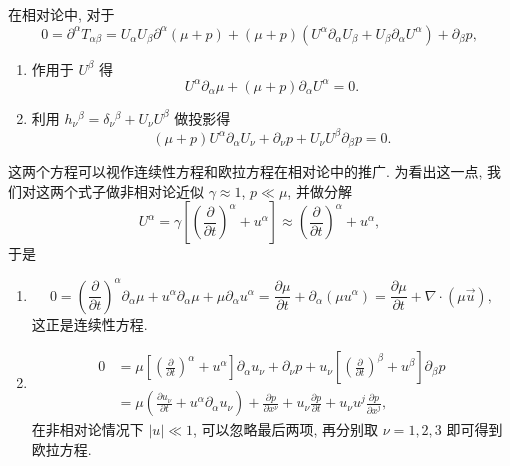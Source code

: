 在相对论中, 对于
\[ 0=\partial^\alpha T_{\alpha \beta}=U_\alpha U_\beta\partial^\alpha(\mu+p)+(\mu+p)(U^\alpha \partial_\alpha U_\beta+U_\beta\partial_\alpha U^\alpha)+\partial_\beta p, \]
\begin{enumerate}
    \item 作用于 $ U^\beta $ 得
    \[ U^\alpha\partial_\alpha\mu+(\mu+p)\partial_\alpha U^\alpha=0. \]
    \item 利用 $ h_\nu{}^\beta=\delta_\nu{}^\beta+U_\nu U^\beta $ 做投影得
    \[ (\mu+p)U^\alpha\partial_\alpha U_\nu +\partial_\nu p+U_\nu U^\beta\partial_\beta p=0. \]
\end{enumerate}
这两个方程可以视作连续性方程和欧拉方程在相对论中的推广. 
为看出这一点, 我们对这两个式子做非相对论近似 $ \gamma\approx 1 $, $ p\ll \mu $, 并做分解
\[ U^\alpha=\gamma\left[ \left( \frac{\partial}{\partial t}\right)^\alpha+u^\alpha \right]\approx \left( \frac{\partial}{\partial t} \right)^\alpha+u^\alpha, \]
于是
\begin{enumerate}
    \item \keepline
    \[ 0=\left( \frac{\partial}{\partial t} \right)^\alpha\partial_\alpha\mu+u^\alpha\partial_\alpha\mu+\mu\partial_\alpha u^\alpha=\frac{\partial\mu}{\partial t}+\partial_\alpha(\mu u^\alpha)=\frac{\partial\mu}{\partial t}+\nabla\cdot(\mu \vec{u}), \]
    这正是连续性方程.
    \item \keepline
    \begin{align*}
        0 &= \mu\left[ \left( \frac{\partial}{\partial t} \right)^\alpha+u^\alpha \right]\partial_\alpha u_\nu+\partial_\nu p+u_\nu\left[ \left( \frac{\partial}{\partial t} \right)^\beta+u^\beta \right]\partial_\beta p\\ 
        &=\mu\left( \frac{\partial u_\nu}{\partial t}+u^\alpha\partial_\alpha u_\nu \right)+\frac{\partial p}{\partial x^\nu}+u_\nu\frac{\partial p}{\partial t}+u_\nu u^j\frac{\partial p}{\partial x^j},
    \end{align*}
    在非相对论情况下 $ |u|\ll 1 $, 可以忽略最后两项, 再分别取 $\nu=1,2,3$ 即可得到欧拉方程.
\end{enumerate}
